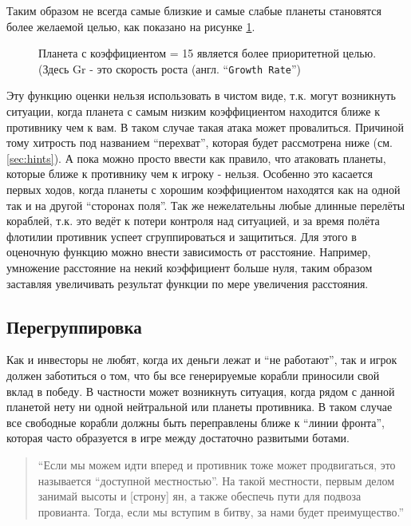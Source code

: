 \documentclass[12pt]{report}
\begin{document}
Таким образом не всегда самые близкие и самые слабые планеты становятся более желаемой целью, как показано на рисунке \ref{fig:targetingFunction}.
\begin{figure}[h]
	\centering
	
	\caption{Планета с коэффициентом = 15 является более приоритетной целью. (Здесь Gr - это скорость роста (англ. ``\texttt{Growth Rate}'')}
	\label{fig:targetingFunction}
\end{figure}

Эту функцию оценки нельзя использовать в чистом виде, т.к. могут возникнуть ситуации, когда планета с самым низким коэффициентом находится ближе к противнику чем к вам. В таком случае такая атака может провалиться. Причиной тому хитрость под названием ``перехват'', которая будет рассмотрена ниже (см. \ref{sec:hints}). А пока можно просто ввести как правило, что атаковать планеты, которые ближе к противнику чем к игроку - нельзя. Особенно это касается первых ходов, когда планеты с хорошим коэффициентом находятся как на одной так и на другой ``сторонах поля''. Так же нежелательны любые длинные перелёты кораблей, т.к. это ведёт к потери контроля над ситуацией, и за время полёта флотилии противник успеет сгруппироваться и защититься. Для этого в оценочную функцию можно внести зависимость от расстояние. Например, умножение расстояние на некий коэффициент больше нуля, таким образом заставляя увеличивать результат функции по мере увеличения расстояния.

\subsection{Перегруппировка}
Как и инвесторы не любят, когда их деньги лежат и ``не работают'', так и игрок должен заботиться о том, что бы все генерируемые корабли приносили свой вклад в победу. В частности может возникнуть ситуация, когда рядом с данной планетой нету ни одной нейтральной или планеты противника. В таком случае все свободные корабли должны быть переправлены ближе к ``линии фронта'', которая часто образуется в игре между достаточно развитыми ботами.

\begin{quote}
``Если мы можем идти вперед и противник тоже может продвигаться, это называется ``доступной местностью''. На такой местности, первым делом занимай высоты и [строну] ян, а также обеспечь пути для подвоза провианта. Тогда, если мы вступим в битву, за нами будет преимущество.''\citep{tzu1971art}
\end{quote}
\end{document}
